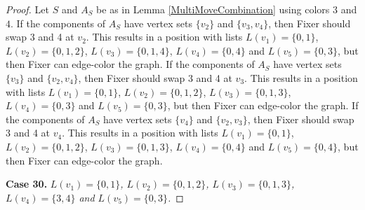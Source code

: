 \documentclass[12pt]{amsart}
\theoremstyle{plain}
\theoremstyle{definition}
\theoremstyle{remark}
\begin{document}
\begin{proof}
Let $S$ and $A_S$ be as in Lemma \ref{MultiMoveCombination} using colors $3$ and $4$. If the components of $A_S$ have vertex sets $\{v_2\}$ and $\{v_3, v_4\}$, then Fixer should swap 3 and 4 at $v_2$. This results in a position with lists $L(v_1) = \{0, 1\}$, $L(v_2) = \{0, 1, 2\}$, $L(v_3) = \{0, 1, 4\}$, $L(v_4) = \{0, 4\}$ and $L(v_5) = \{0, 3\}$, but then Fixer can edge-color the graph.
If the components of $A_S$ have vertex sets $\{v_3\}$ and $\{v_2, v_4\}$, then Fixer should swap 3 and 4 at $v_3$. This results in a position with lists $L(v_1) = \{0, 1\}$, $L(v_2) = \{0, 1, 2\}$, $L(v_3) = \{0, 1, 3\}$, $L(v_4) = \{0, 3\}$ and $L(v_5) = \{0, 3\}$, but then Fixer can edge-color the graph.
If the components of $A_S$ have vertex sets $\{v_4\}$ and $\{v_2, v_3\}$, then Fixer should swap 3 and 4 at $v_4$. This results in a position with lists $L(v_1) = \{0, 1\}$, $L(v_2) = \{0, 1, 2\}$, $L(v_3) = \{0, 1, 3\}$, $L(v_4) = \{0, 4\}$ and $L(v_5) = \{0, 4\}$, but then Fixer can edge-color the graph.

\noindent\textbf{Case 30.  }\textit{$L(v_1) = \{0, 1\}$, $L(v_2) = \{0, 1, 2\}$, $L(v_3) = \{0, 1, 3\}$, $L(v_4) = \{3, 4\}$ and $L(v_5) = \{0, 3\}$.}


\end{proof}
\end{document}
